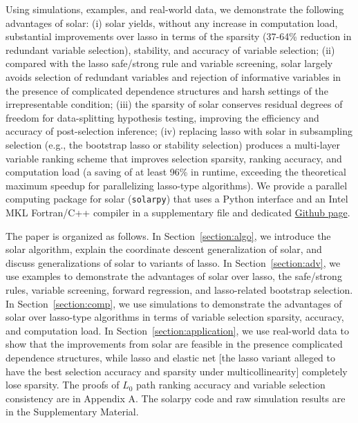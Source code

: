 \documentclass[11pt,review,authoryear]{elsarticle}
\begin{document}
Using simulations, examples, and real-world data, we demonstrate the following advantages of solar: (i) solar yields, without any increase in computation load, substantial improvements over lasso in terms of the sparsity (37-64\% reduction in redundant variable selection), stability, and accuracy of variable selection; (ii) compared with the lasso safe/strong rule and variable screening, solar largely avoids selection of redundant variables and rejection of informative variables in the presence of complicated dependence structures and harsh settings of the irrepresentable condition; (iii) the sparsity of solar conserves residual degrees of freedom for data-splitting hypothesis testing, improving the efficiency and accuracy of post-selection inference; (iv) replacing lasso with solar in subsampling selection (e.g., the bootstrap lasso or stability selection) produces a multi-layer variable ranking scheme that improves selection sparsity, ranking accuracy, and computation load (a saving of at least 96\% in runtime, exceeding the theoretical maximum speedup for parallelizing lasso-type algorithms). We provide a parallel computing package for solar (\texttt{solarpy}) that uses a Python interface and an Intel MKL Fortran/C++ compiler in a supplementary file and dedicated \href{https://github.com/isaac2math/solarpy}{Github page}.

The paper is organized as follows. In Section~\ref{section:algo}, we introduce the solar algorithm, explain the coordinate descent generalization of solar, and discuss generalizations of solar to variants of lasso. In Section~\ref{section:adv}, we use examples to demonstrate the advantages of solar over lasso, the safe/strong rules, variable screening, forward regression, and lasso-related bootstrap selection. In Section~\ref{section:comp}, we use simulations to demonstrate the advantages of solar over lasso-type algorithms in terms of variable selection sparsity, accuracy, and computation load. In Section~\ref{section:application}, we use real-world data to show that the improvements from solar are feasible in the presence complicated dependence structures, while lasso and elastic net [the lasso variant alleged \citep{zou2005regularization, jia2010model} to have the best selection accuracy and sparsity under multicollinearity] completely lose sparsity. The proofs of $L_0$ path ranking accuracy and variable selection consistency are in Appendix A. The solarpy code and raw simulation results are in the Supplementary Material.

\end{document}
